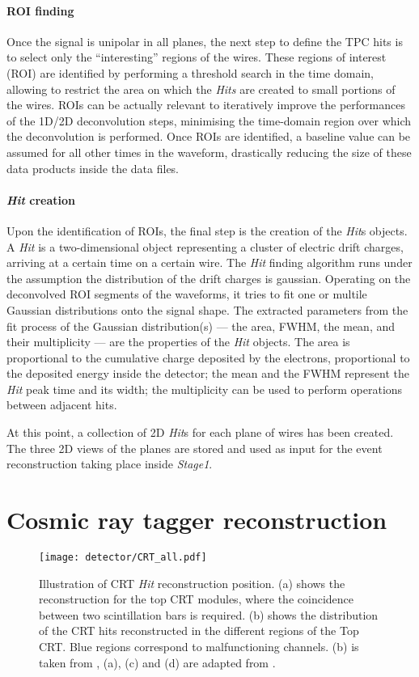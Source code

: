 \paragraph{ROI finding} Once the signal is unipolar in all planes, the next step to define the TPC hits is to select only the ``interesting'' regions of the wires. These regions of interest (ROI) are identified by performing a threshold search in the time domain, allowing to restrict the area on which the \emph{Hits} are created to small portions of the wires. ROIs can be actually relevant to iteratively improve the performances of the 1D/2D deconvolution steps, minimising the time-domain region over which the deconvolution is performed. Once ROIs are identified, a baseline value can be assumed for all other times in the waveform, drastically reducing the size of these data products inside the data files. 

\paragraph{\emph{Hit} creation} Upon the identification of ROIs, the final step is the creation of the \emph{Hit}s objects. A \emph{Hit} is a two-dimensional object representing a cluster of electric drift charges, arriving at a certain time on a certain wire. The \emph{Hit} finding algorithm runs under the assumption the distribution of the drift charges is gaussian. Operating on the deconvolved ROI segments of the waveforms, it tries to fit one or multile Gaussian distributions onto the signal shape. The extracted parameters from the fit process of the Gaussian distribution(s) --- the area, FWHM, the mean, and their multiplicity --- are the properties of the \emph{Hit} objects. The area is proportional to the cumulative charge deposited by the electrons, proportional to the deposited energy inside the detector; the mean and the FWHM represent the \emph{Hit} peak time and its width; the multiplicity can be used to perform operations between adjacent hits. 

At this point, a collection of 2D \emph{Hit}s for each plane of wires has been created. The three 2D views of the planes are stored and used as input for the event reconstruction taking place inside \emph{Stage1}. 

\section{Cosmic ray tagger reconstruction} 

\begin{figure}
    \centering
    \texttt{[image: detector/CRT\_all.pdf]}
    \caption[CRT Hit reconstruction in space]{Illustration of CRT \emph{Hit} reconstruction position. (a) shows the reconstruction for the top CRT modules, where the coincidence between two scintillation bars is required. (b) shows the distribution of the CRT hits reconstructed in the different regions of the Top CRT. Blue regions
correspond to malfunctioning channels. (b) is taken from \cite{Poppi:2023zmp}, (a), (c) and (d) are adapted from \cite{arteroponsStudyReconstructionNuMuCC}.}
    \label{fig:CRT_reco}
\end{figure}

